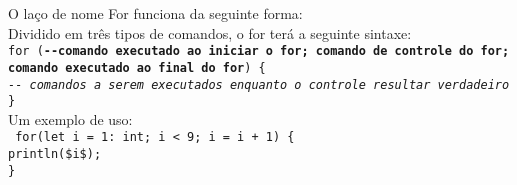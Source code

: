 \documentclass[12pt,a4paper]{article}
\def\emph#1{\textbf{#1}} %
\begin{document}
O laço de nome For funciona da seguinte forma: \\

Dividido em três tipos de comandos, o for terá a seguinte sintaxe: \\

\noindent\texttt{for (\emph{-{}-comando executado ao iniciar o for; comando de controle do for; comando executado ao final do for}) \{\\
\indent\textit{-{}- comandos a serem executados enquanto o controle resultar verdadeiro} \\
\}}\\

Um exemplo de uso: \\[0.2cm]
\texttt{
\noindent for(let i = 1: int; i < 9; i = i + 1) \{\\
\indent println(\$i\$);\\
\noindent \}\\
}
\end{document}
